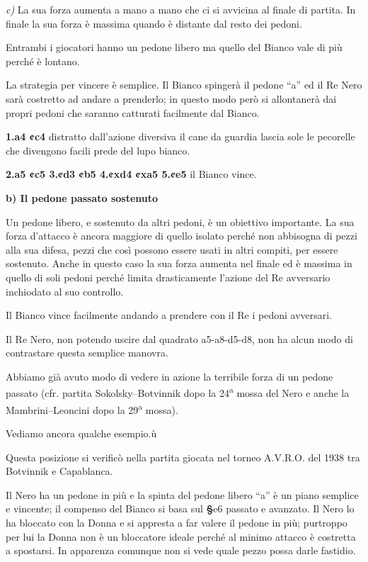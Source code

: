 \emph{c)} La sua forza aumenta a mano a mano che ci si avvicina al
finale di partita. In finale la sua forza è massima quando è distante
dal resto dei pedoni.


Entrambi i giocatori hanno un pedone libero ma quello del Bianco vale di
più perché è lontano.

La strategia per vincere è semplice. Il Bianco spingerà il pedone ``a''
ed il Re Nero sarà costretto ad andare a prenderlo; in questo modo però
si allontanerà dai propri pedoni che saranno catturati facilmente dal
Bianco.

\textbf{1.a4 ¢c4} distratto dall'azione diversiva il cane da guardia
lascia sole le pecorelle che divengono facili prede del lupo bianco.

\textbf{2.a5 ¢c5 3.¢d3 ¢b5 4.¢xd4 ¢xa5 5.¢e5} il Bianco vince.

\textbf{b) Il pedone passato sostenuto}

Un pedone libero, e sostenuto da altri pedoni, è un obiettivo
importante. La sua forza d'attacco è ancora maggiore di quello isolato
perché non abbisogna di pezzi alla sua difesa, pezzi che così possono
essere usati in altri compiti, per essere sostenuto. Anche in questo
caso la sua forza aumenta nel finale ed è massima in quello di soli
pedoni perché limita drasticamente l'azione del Re avversario inchiodato
al suo controllo.


Il Bianco vince facilmente andando a prendere con il Re i pedoni
avversari.

Il Re Nero, non potendo uscire dal quadrato a5-a8-d5-d8, non ha alcun
modo di contrastare questa semplice manovra.

Abbiamo già avuto modo di vedere in azione la terribile forza di un
pedone passato (cfr. partita Sokolsky--Botvinnik dopo la
24\textsuperscript{a} mossa del Nero e anche la Mambrini--Leoncini dopo
la 29\textsuperscript{a} mossa).

Vediamo ancora qualche esempio.ù


Questa posizione si verificò nella partita giocata nel torneo A.V.R.O.
del 1938 tra Botvinnik e Capablanca.

Il Nero ha un pedone in più e la spinta del pedone libero ``a'' è un
piano semplice e vincente; il compenso del Bianco si basa sul
\textbf{§}e6 passato e avanzato. Il Nero lo ha bloccato con la Donna e
si appresta a far valere il pedone in più; purtroppo per lui la Donna
non è un bloccatore ideale perché al minimo attacco è costretta a
spostarsi. In apparenza comunque non si vede quale pezzo possa darle
fastidio.

